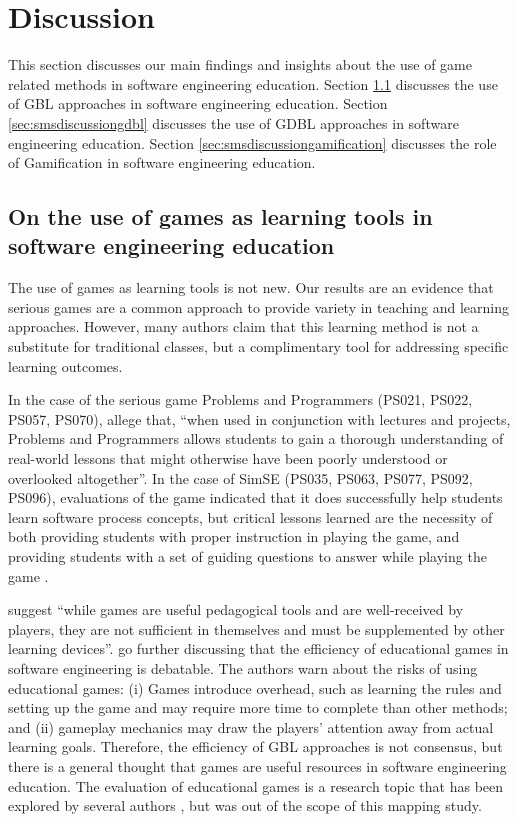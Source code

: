 \section{Discussion}
\label{sec:smsdiscussion}

This section discusses our main findings and insights about the use of game related methods in software engineering education. Section \ref{sec:smsdiscussiongbl} discusses the use of GBL approaches in software engineering education. Section \ref{sec:smsdiscussiongdbl} discusses the use of GDBL approaches in software engineering education. Section \ref{sec:smsdiscussiongamification} discusses the role of Gamification in software engineering education.

\subsection{On the use of games as learning tools in software engineering education}
\label{sec:smsdiscussiongbl}

The use of games as learning tools is not new. Our results are an evidence that serious games are a common approach to provide variety in teaching and learning approaches. However, many authors claim that this learning method is not a substitute for traditional classes, but a complimentary tool for addressing specific learning outcomes.

In the case of the serious game Problems and Programmers (PS021, PS022, PS057, PS070), \cite{Baker:2005} allege that, “when used in conjunction with lectures and projects, Problems and Programmers allows students to gain a thorough understanding of real-world lessons that might otherwise have been poorly understood or overlooked altogether”. In the case of SimSE (PS035, PS063, PS077, PS092, PS096), evaluations of the game indicated that it does successfully help students learn software process concepts, but critical lessons learned are the necessity of both providing students with proper instruction in playing the game, and providing students with a set of guiding questions to answer while playing the game \citep{Navarro:2009}.

\cite{Caulfield:2011} suggest “while games are useful pedagogical tools and are well-received by players, they are not sufficient in themselves and must be supplemented by other learning devices”. \cite{Heikkila:2016} go further discussing that the efficiency of educational games in software engineering is debatable. The authors warn about the risks of using educational games: (i) Games introduce overhead, such as learning the rules and setting up the game and may require more time to complete than other methods; and (ii) gameplay mechanics may draw the players’ attention away from actual learning goals. Therefore, the efficiency of GBL approaches is not consensus, but there is a general thought that games are useful resources in software engineering education. The evaluation of educational games is a research topic that has been explored by several authors \citep{Peixoto:2014, Andriano:2011, Navarro:2007, Savi:2011}, but was out of the scope of this mapping study.

